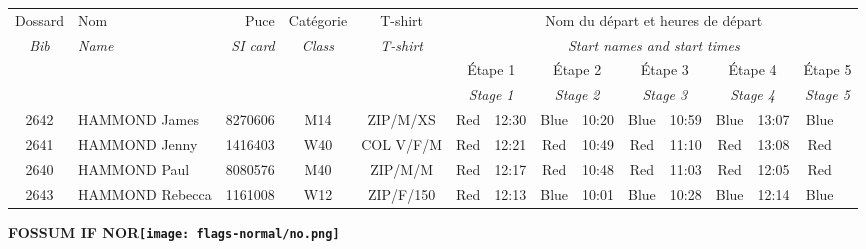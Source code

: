 \documentclass{report}
\begin{document}
  \begin{longtable}{|c|l|r|c|c|*{5}{cc|}}
    Dossard & Nom  & Puce    & Catégorie & T-shirt & \multicolumn{10}{c|}{Nom du départ et heures de départ} \\
    \itshape Bib     & \itshape Name & \itshape SI card & \itshape Class  & \itshape  T-shirt  & \multicolumn{10}{c|}{\itshape Start names and start times} \\
    \hline
    & & & & & \multicolumn{2}{c|}{Étape 1} & \multicolumn{2}{c|}{Étape 2} & \multicolumn{2}{c|}{Étape 3} & \multicolumn{2}{c|}{Étape 4} & \multicolumn{2}{c|}{Étape 5} \\
    & & & & & \multicolumn{2}{c|}{\itshape Stage 1} & \multicolumn{2}{c|}{\itshape Stage 2} & \multicolumn{2}{c|}{\itshape Stage 3} & \multicolumn{2}{c|}{\itshape Stage 4} & \multicolumn{2}{c|}{\itshape Stage 5} \\
    \hline
    2642 & HAMMOND James & 8270606 & M14 & ZIP/M/XS & Red & 12:30 & Blue & 10:20 & Blue & 10:59 & Blue & 13:07 & Blue &  \\
    2641 & HAMMOND Jenny & 1416403 & W40 & COL V/F/M & Red & 12:21 & Red & 10:49 & Red & 11:10 & Red & 13:08 & Red &  \\
    2640 & HAMMOND Paul & 8080576 & M40 & ZIP/M/M & Red & 12:17 & Red & 10:48 & Red & 11:03 & Red & 12:05 & Red &  \\
    2643 & HAMMOND Rebecca & 1161008 & W12 & ZIP/F/150 & Red & 12:13 & Blue & 10:01 & Blue & 10:28 & Blue & 12:14 & Blue &  \\
  \end{longtable}
\newpage
  \Huge \centering \bfseries FOSSUM IF  NOR\normalfont \footnotesize \sffamily \hfill \texttt{[image: flags-normal/no.png]} \newline 
\end{document}
